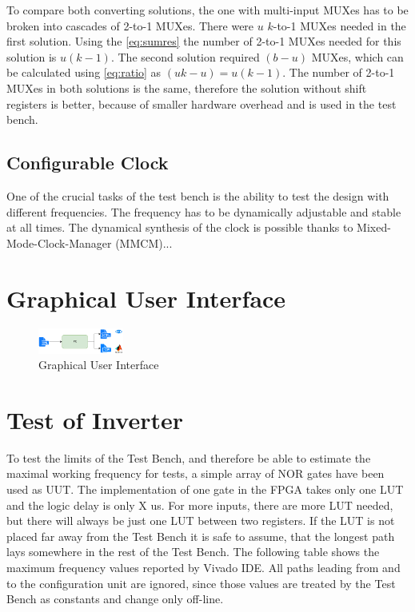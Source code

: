 To compare both converting solutions, the one with multi-input MUXes has to be broken into cascades of 2-to-1 MUXes. There were $u$ $k$-to-1 MUXes needed in the first solution. Using the \autoref*{eq:sumres} the number of 2-to-1 MUXes needed for this solution is $u(k-1)$. The second solution required $(b-u)$ MUXes, which can be calculated using \autoref*{eq:ratio} as $(uk-u)=u(k-1)$. The number of 2-to-1 MUXes in both solutions is the same, therefore the solution without shift registers is better, because of smaller hardware overhead and is used in the test bench.

\subsection{Configurable Clock}
One of the crucial tasks of the test bench is the ability to test the design with different frequencies. The frequency has to be dynamically adjustable and stable at all times. The dynamical synthesis of the clock is possible thanks to Mixed-Mode-Clock-Manager (MMCM)...

\section{Graphical User Interface}

\begin{figure}[h]
\centering
\includegraphics[width=0.25\textwidth]{figures/PC.png}
\caption{Graphical User Interface}
\label{fig:gui}
\end{figure}

\section{Test of Inverter}
To test the limits of the Test Bench, and therefore be able to estimate the maximal working frequency for tests, a simple array of NOR gates have been used as UUT. The implementation of one gate in the FPGA takes only one LUT and the logic delay is only X us. For more inputs, there are more LUT needed, but there will always be just one LUT between two registers. If the LUT is not placed far away from the Test Bench it is safe to assume, that the longest path lays somewhere in the rest of the Test Bench. The following table shows the maximum frequency values reported by Vivado IDE. All paths leading from and to the configuration unit are ignored, since those values are treated by the Test Bench as constants and change only off-line.

